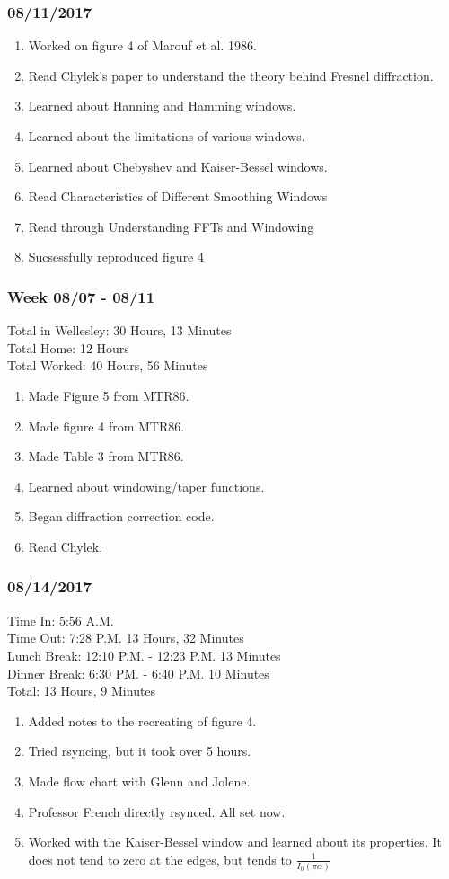 \documentclass[crop=false,class=book]{standalone}
\begin{document}
\subsubsection{\footnotesize 08/11/2017}
\begin{enumerate}
    \item Worked on figure 4 of Marouf et al. 1986.
    \item Read Chylek's paper to understand the theory behind Fresnel diffraction.
    \item Learned about Hanning and Hamming windows.
    \item Learned about the limitations of various windows.
    \item Learned about Chebyshev and Kaiser-Bessel windows.
    \item Read Characteristics of Different Smoothing Windows
    \item Read through Understanding FFTs and Windowing
    \item Sucsessfully reproduced figure 4
\end{enumerate}
\subsubsection{\footnotesize Week 08/07 - 08/11}
Total in Wellesley: \hfill 30 Hours, 13 Minutes\\
Total Home: \hfill 12 Hours\\
Total Worked: \hfill 40 Hours, 56 Minutes
\begin{enumerate}
    \item Made Figure 5 from MTR86.
    \item Made figure 4 from MTR86.
    \item Made Table 3 from MTR86.
    \item Learned about windowing/taper functions.
    \item Began diffraction correction code.
    \item Read Chylek.
\end{enumerate}
\subsubsection{\footnotesize 08/14/2017}
Time In: 5:56 A.M.\\
Time Out: 7:28 P.M. \hfill 13 Hours, 32 Minutes\\
Lunch Break: 12:10 P.M. - 12:23 P.M. \hfill 13 Minutes\\
Dinner Break: 6:30 PM. - 6:40 P.M. \hfill 10 Minutes\\
Total: \hfill 13 Hours, 9 Minutes
\begin{enumerate}
    \item Added notes to the recreating of figure 4.
    \item Tried rsyncing, but it took over 5 hours.
    \item Made flow chart with Glenn and Jolene.
    \item Professor French directly rsynced. All set now.
    \item Worked with the Kaiser-Bessel window and learned about its properties. It does not tend to zero at the edges, but tends to $\frac{1}{I_{0}(\pi \alpha)}$
\end{enumerate}
\end{document}
